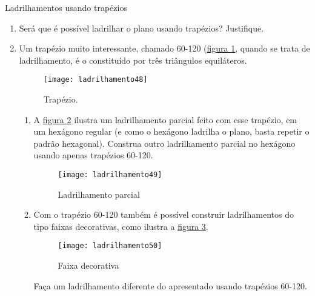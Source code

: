 \begin{task}{Ladrilhamentos usando trapézios}
\begin{enumerate}
\item Será que é possível ladrilhar o plano usando trapézios? Justifique.

\item Um trapézio muito interessante, chamado 60-120 (\hyperref[trap1]{figura \ref{trap1}}, quando se trata de ladrilhamento, é o constituído por três triângulos equiláteros.

\begin{figure}[H]
\centering
\texttt{[image: ladrilhamento48]}
\caption{Trapézio.}
\label{trap1}
\end{figure}

\begin{enumerate}
	\item A \hyperref[trap2]{figura \ref{trap2}} ilustra um ladrilhamento parcial feito com esse trapézio, em um hexágono regular (e como o hexágono ladrilha o plano, basta repetir o padrão hexagonal). Construa outro ladrilhamento parcial no hexágono usando apenas trapézios 60-120.

	\begin{figure}[H]
	\centering
	\texttt{[image: ladrilhamento49]}
	\caption{Ladrilhamento parcial}
	\label{trap2}
	\end{figure}

	\item Com o trapézio 60-120 também é possível construir ladrilhamentos do tipo faixas decorativas, como ilustra a \hyperref[trap3]{figura \ref{trap3}}. 

	\begin{figure}[H]
	\centering
	\texttt{[image: ladrilhamento50]}
	\caption{Faixa decorativa}
     \label{trap3}
	\end{figure}
	
Faça um ladrilhamento diferente do apresentado usando trapézios 60-120.

\end{enumerate}
\end{enumerate}
\end{task}


\clearpage


